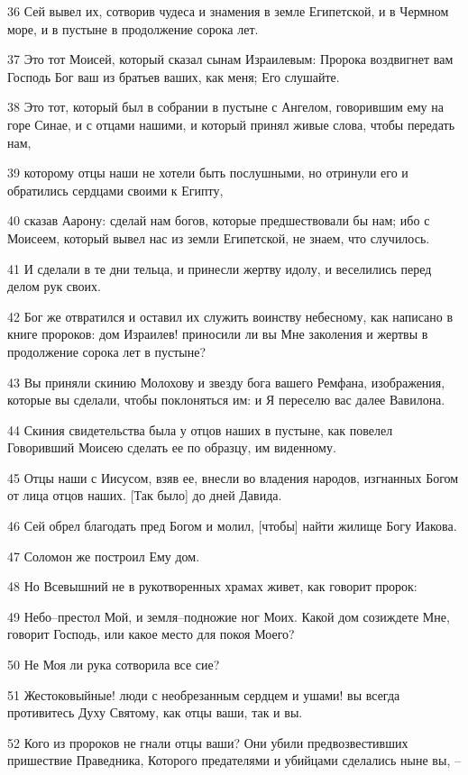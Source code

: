 \par 36 Сей вывел их, сотворив чудеса и знамения в земле Египетской, и в Чермном море, и в пустыне в продолжение сорока лет.
\par 37 Это тот Моисей, который сказал сынам Израилевым: Пророка воздвигнет вам Господь Бог ваш из братьев ваших, как меня; Его слушайте.
\par 38 Это тот, который был в собрании в пустыне с Ангелом, говорившим ему на горе Синае, и с отцами нашими, и который принял живые слова, чтобы передать нам,
\par 39 которому отцы наши не хотели быть послушными, но отринули его и обратились сердцами своими к Египту,
\par 40 сказав Аарону: сделай нам богов, которые предшествовали бы нам; ибо с Моисеем, который вывел нас из земли Египетской, не знаем, что случилось.
\par 41 И сделали в те дни тельца, и принесли жертву идолу, и веселились перед делом рук своих.
\par 42 Бог же отвратился и оставил их служить воинству небесному, как написано в книге пророков: дом Израилев! приносили ли вы Мне заколения и жертвы в продолжение сорока лет в пустыне?
\par 43 Вы приняли скинию Молохову и звезду бога вашего Ремфана, изображения, которые вы сделали, чтобы поклоняться им: и Я переселю вас далее Вавилона.
\par 44 Скиния свидетельства была у отцов наших в пустыне, как повелел Говоривший Моисею сделать ее по образцу, им виденному.
\par 45 Отцы наши с Иисусом, взяв ее, внесли во владения народов, изгнанных Богом от лица отцов наших. [Так было] до дней Давида.
\par 46 Сей обрел благодать пред Богом и молил, [чтобы] найти жилище Богу Иакова.
\par 47 Соломон же построил Ему дом.
\par 48 Но Всевышний не в рукотворенных храмах живет, как говорит пророк:
\par 49 Небо--престол Мой, и земля--подножие ног Моих. Какой дом созиждете Мне, говорит Господь, или какое место для покоя Моего?
\par 50 Не Моя ли рука сотворила все сие?
\par 51 Жестоковыйные! люди с необрезанным сердцем и ушами! вы всегда противитесь Духу Святому, как отцы ваши, так и вы.
\par 52 Кого из пророков не гнали отцы ваши? Они убили предвозвестивших пришествие Праведника, Которого предателями и убийцами сделались ныне вы, --
